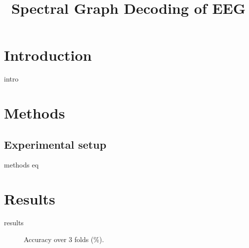 \documentclass{article}
\title{Spectral Graph Decoding of EEG}
\begin{document}
\maketitle
\section{Introduction}
{{intro}}
\section{Methods}
\subsection[Setup]{Experimental setup}
{{methods}}
{{eq}}
\section{Results}
{{results}}
\begin{figure}
\centering
\caption{Accuracy over 3 folds (\%).}
\label{fig:folds}
\end{figure}


\end{document}
